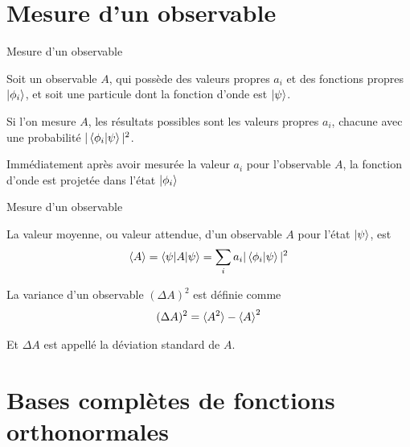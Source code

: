 \documentclass[xcolor=svgnames,t,aspectratio=169,handout]{uqtrcours}
\begin{document}
\section{Mesure d'un observable}
\frame{\sectionpage}



\begin{frame}{Mesure d'un observable}


Soit un observable $A$, qui possède des
  valeurs propres $a_i$ et des
  fonctions propres $\ket{\phi_i}$,
  et soit une particule dont la fonction d'onde est $\ket{\psi}$.

\bigskip
Si l'on mesure $A$, les résultats possibles sont les valeurs propres $a_i$,
  chacune avec une probabilité $\vert \braket{\phi_i \vert \psi} \vert^2$.
%

\bigskip
Immédiatement après avoir mesurée la valeur $a_i$ pour l'observable $A$,
  la fonction d'onde est projetée dans l'état $\ket{\phi_i}$

\end{frame}




\begin{frame}{Mesure d'un observable}

La valeur moyenne, ou valeur attendue, d'un observable $A$ pour l'état $\ket{\psi}$, est
\begin{align}
  \braket{A} =
  \braket{\psi \vert A \vert \psi} = \sum_{i} a_i \vert \braket{\phi_i \vert \psi} \vert^2
\end{align}

\bigskip

La variance d'un observable $(\Delta A)^2$ est définie comme
\begin{align}
  (\Delta A)^2 = \braket{A^2} - \braket{A}^2
\end{align}

Et $\Delta A$ est appellé la déviation standard de $A$.

\end{frame}





\section{Bases complètes de fonctions orthonormales}
\frame{\sectionpage}
\end{document}

